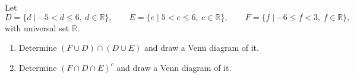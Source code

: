 Let
\[
D=\{d\mid -5<d\le6,\ d\in\mathbb{R}\},\qquad E=\{e\mid 5<e\le6,\ e\in\mathbb{R}\},\qquad F=\{f\mid -6\le f<3,\ f\in\mathbb{R}\},
\]
with universal set $\mathbb{R}$.
\begin{enumerate}
\item[(a)] Determine $(F\cup D)\cap(D\cup E)$ and draw a Venn diagram of it.
\item[(b)] Determine $(F\cap D\cap E)^c$ and draw a Venn diagram of it.
\end{enumerate}
